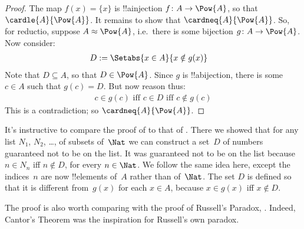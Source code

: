 \documentclass[../../../include/open-logic-section]{subfiles}
\begin{document}
\begin{proof}
	The map $f(x) = \{x\}$ is !!a{injection} $f \colon A \to \Pow{A}$, so that $\cardle{A}{\Pow{A}}$. It remains to show that $\cardneq{A}{\Pow{A}}$. So, for reductio, suppose $A \approx \Pow{A}$, i.e.\ there is some bijection $g \colon A \to \Pow{A}$. Now consider:
	\begin{align*}
		D &:= \Setabs{x \in A}{x \notin g(x)}
	\end{align*}
	Note that $D \subseteq A$, so that $D \in \Pow{A}$. Since $g$ is !!a{bijection}, there is some $c \in A$ such that $g(c) = D$. But now reason thus:
	\begin{align*}
		c \in g(c) \text{ iff }c \in D \text{ iff }c \notin g(c)
	\end{align*}
	This is a contradiction; so $\cardneq{A}{\Pow{A}}$.
%
\end{proof}

\begin{explain}
  It's instructive to compare the proof of  to that
  of . There we showed that for any
  list $N_1$, $N_2$, \dots, of subsets of~$\Nat$ we can construct a
  set~$D$ of numbers guaranteed not to be on the list. It
  was guaranteed not to be on the list because $n \in N_n$ iff $n \notin D$, for every $n \in
  \Nat$. We follow the same idea here,
  except the indices~$n$ are now !!{element}s of~$A$ rather than
  of~$\Nat$. The set $D$ is defined so that it is
  different from~$g(x)$ for each $x \in A$, because $x \in g(x)$ iff
  $x \notin D$. %
  
  The proof is also worth comparing with the proof of Russell's Paradox, . Indeed, Cantor's Theorem was the inspiration for Russell's own paradox.
\end{explain}
\end{document}
